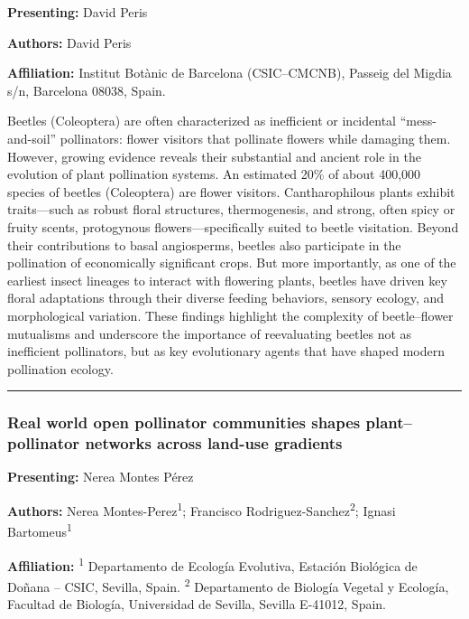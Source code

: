 \documentclass[
  letterpaper,
  DIV=11,
  numbers=noendperiod]{scrartcl}
\begin{document}
\textbf{Presenting:} David Peris

\textbf{Authors:} David Peris

\textbf{Affiliation:} Institut Botànic de Barcelona (CSIC--CMCNB),
Passeig del Migdia s/n, Barcelona 08038, Spain.

Beetles (Coleoptera) are often characterized as inefficient or
incidental ``mess- and-soil'' pollinators: flower visitors that
pollinate flowers while damaging them. However, growing evidence reveals
their substantial and ancient role in the evolution of plant pollination
systems. An estimated 20\% of about 400,000 species of beetles
(Coleoptera) are flower visitors. Cantharophilous plants exhibit
traits---such as robust floral structures, thermogenesis, and strong,
often spicy or fruity scents, protogynous flowers---specifically suited
to beetle visitation. Beyond their contributions to basal angiosperms,
beetles also participate in the pollination of economically significant
crops. But more importantly, as one of the earliest insect lineages to
interact with flowering plants, beetles have driven key floral
adaptations through their diverse feeding behaviors, sensory ecology,
and morphological variation. These findings highlight the complexity of
beetle--flower mutualisms and underscore the importance of reevaluating
beetles not as inefficient pollinators, but as key evolutionary agents
that have shaped modern pollination ecology.

\begin{center}\rule{0.5\linewidth}{0.5pt}\end{center}

\subsubsection{Real world open pollinator communities shapes
plant--pollinator networks across land-use
gradients}\label{real-world-open-pollinator-communities-shapes-plantpollinator-networks-across-land-use-gradients}

\textbf{Presenting:} Nerea Montes Pérez

\textbf{Authors:} Nerea Montes-Perez\textsuperscript{1}; Francisco
Rodriguez-Sanchez\textsuperscript{2}; Ignasi
Bartomeus\textsuperscript{1}

\textbf{Affiliation:} \textsuperscript{1} Departamento de Ecología
Evolutiva, Estación Biológica de Doñana -- CSIC, Sevilla, Spain.
\textsuperscript{2} Departamento de Biología Vegetal y Ecología,
Facultad de Biología, Universidad de Sevilla, Sevilla E-41012, Spain.
\end{document}
